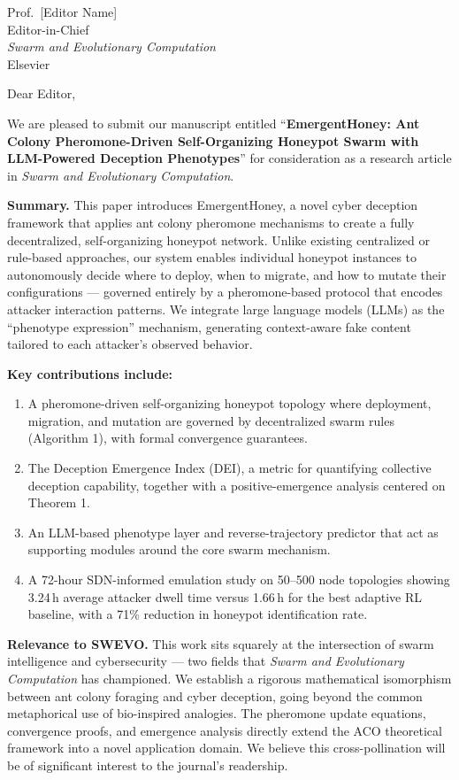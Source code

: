 \documentclass[11pt]{letter}
\begin{document}
\begin{letter}{Prof.~[Editor Name]\\
Editor-in-Chief\\
\textit{Swarm and Evolutionary Computation}\\
Elsevier}

\opening{Dear Editor,}

We are pleased to submit our manuscript entitled ``\textbf{EmergentHoney: Ant Colony Pheromone-Driven Self-Organizing Honeypot Swarm with LLM-Powered Deception Phenotypes}'' for consideration as a research article in \textit{Swarm and Evolutionary Computation}.

\textbf{Summary.} This paper introduces EmergentHoney, a novel cyber deception framework that applies ant colony pheromone mechanisms to create a fully decentralized, self-organizing honeypot network. Unlike existing centralized or rule-based approaches, our system enables individual honeypot instances to autonomously decide where to deploy, when to migrate, and how to mutate their configurations — governed entirely by a pheromone-based protocol that encodes attacker interaction patterns. We integrate large language models (LLMs) as the ``phenotype expression'' mechanism, generating context-aware fake content tailored to each attacker's observed behavior.

\textbf{Key contributions include:}
\begin{enumerate}
    \item A pheromone-driven self-organizing honeypot topology where deployment, migration, and mutation are governed by decentralized swarm rules (Algorithm 1), with formal convergence guarantees.
    \item The Deception Emergence Index (DEI), a metric for quantifying collective deception capability, together with a positive-emergence analysis centered on Theorem 1.
    \item An LLM-based phenotype layer and reverse-trajectory predictor that act as supporting modules around the core swarm mechanism.
    \item A 72-hour SDN-informed emulation study on 50--500 node topologies showing 3.24$\,$h average attacker dwell time versus 1.66$\,$h for the best adaptive RL baseline, with a 71\% reduction in honeypot identification rate.
\end{enumerate}

\textbf{Relevance to SWEVO.} This work sits squarely at the intersection of swarm intelligence and cybersecurity — two fields that \textit{Swarm and Evolutionary Computation} has championed. We establish a rigorous mathematical isomorphism between ant colony foraging and cyber deception, going beyond the common metaphorical use of bio-inspired analogies. The pheromone update equations, convergence proofs, and emergence analysis directly extend the ACO theoretical framework into a novel application domain. We believe this cross-pollination will be of significant interest to the journal's readership.


\end{letter}
\end{document}
